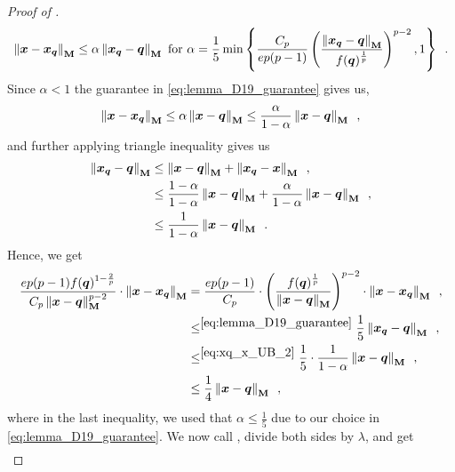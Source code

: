 \begin{proof}[Proof of ]
\begin{align}
    \left\lVert \bm{x}-\bm{x}_{\bm{q}} \right\rVert_{\mathbf{M}} \le \alpha\left\lVert \bm{x}_{\bm{q}}-\bm{q} \right\rVert_{\mathbf{M}} \text{ for } \alpha = \frac{1}{5}\min\left\{\frac{C_p}{ep(p-1)}\left(\frac{\left\lVert \bm{x}_{\bm{q}}-\bm{q} \right\rVert_{\mathbf{M}}}{f(\bm{q})^{\frac{1}{p}}}\right)^{p-2}, 1\right\}\enspace.\label{eq:lemma_D19_guarantee}
\end{align}
Since $\alpha < 1$ the guarantee in \eqref{eq:lemma_D19_guarantee} gives us,
\begin{align}
    \left\lVert \bm{x}-\bm{x}_{\bm{q}} \right\rVert_{\mathbf{M}} \le \alpha\left\lVert \bm{x}-\bm{q} \right\rVert_{\mathbf{M}} \leq \frac{\alpha}{1-\alpha}
    \left\lVert \bm{x}-\bm{q} \right\rVert_{\mathbf{M}}\enspace,\label{eq:xq_x_UB_1}
\end{align}
and further applying triangle inequality gives us
\begin{align}
    \left\lVert \bm{x}_{\bm{q}}-\bm{q} \right\rVert_{\mathbf{M}} &\le \left\lVert \bm{x}-\bm{q} \right\rVert_{\mathbf{M}} +  \left\lVert \bm{x}_{\bm{q}}-\bm{x} \right\rVert_{\mathbf{M}}\enspace,\nonumber\\ 
    &\le \frac{1-\alpha}{1-\alpha}\left\lVert \bm{x}-\bm{q} \right\rVert_{\mathbf{M}} + \frac{\alpha}{1-\alpha}\left\lVert \bm{x}-\bm{q} \right\rVert_{\mathbf{M}}\enspace,\nonumber\\
    &\le \frac{1}{1-\alpha}\left\lVert \bm{x}-\bm{q} \right\rVert_{\mathbf{M}}\enspace.\label{eq:xq_x_UB_2}
\end{align}
Hence, we get
\begin{align}
    \frac{ep(p-1)f(\bm{q})^{1-\frac{2}{p}}}{C_p\left\lVert \bm{x}-\bm{q} \right\rVert_{\mathbf{M}}^{p-2}} \cdot \left\lVert \bm{x}-\bm{x}_{\bm{q}} \right\rVert_{\mathbf{M}} &= \frac{ep(p-1)}{C_p} \cdot \left(\frac{f(\bm{q})^{\frac{1}{p}}}{\left\lVert \bm{x}-\bm{q} \right\rVert_{\mathbf{M}}}\right)^{p-2} \cdot \left\lVert \bm{x}-\bm{x}_{\bm{q}} \right\rVert_{\mathbf{M}}\enspace,\nonumber\\
    &\le^{\eqref{eq:lemma_D19_guarantee}} \frac{1}{5}\left\lVert \bm{x}_{\bm{q}}-\bm{q} \right\rVert_{\mathbf{M}}\enspace,\nonumber\\ &\le^{\eqref{eq:xq_x_UB_2}} \frac{1}{5}\cdot\frac{1}{1-\alpha}\left\lVert \bm{x}-\bm{q} \right\rVert_{\mathbf{M}}\enspace,\nonumber\\
    &\leq \frac{1}{4}\left\lVert \bm{x}-\bm{q} \right\rVert_{\mathbf{M}}\enspace,\label{eq:xq_x_UB_3}
\end{align}
where in the last inequality, we used that $\alpha \leq \frac{1}{5}$ due to our choice in \eqref{eq:lemma_D19_guarantee}. We now call , divide both sides by $\lambda$, and get
\begin{align*}

\end{align*}
\end{proof}
